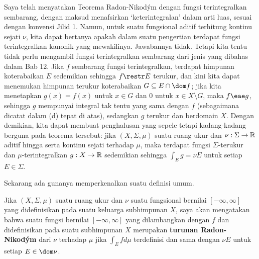 { Saya telah menyatakan Teorema Radon-Nikod\'ym
dengan fungsi terintegralkan sembarang, dengan maksud menafsirkan
`keterintegralan' dalam arti luas, sesuai dengan konvensi Jilid 1. Namun,
untuk suatu fungsional aditif terhitung kontinu sejati $\nu$, kita
dapat bertanya apakah dalam suatu pengertian terdapat fungsi terintegralkan
kanonik yang mewakilinya. Jawabannya tidak. Tetapi kita tentu tidak perlu
mengambil fungsi terintegralkan sembarang dari jenis yang dibahas dalam
Bab 12. Jika $f$ sembarang fungsi terintegralkan, terdapat himpunan
koterabaikan $E$ sedemikian sehingga $f\restr E$ terukur, dan kini kita
dapat menemukan himpunan terukur koterabaikan
$G\subseteq E\cap\dom f$; jika kita menetapkan $g(x)=f(x)$ untuk
$x\in G$ dan $0$ untuk $x\in X\setminus G$, maka $f\eae g$, sehingga
$g$ mempunyai integral tak tentu yang sama dengan $f$ (sebagaimana dicatat
dalam (d) tepat di atas), sedangkan $g$ terukur dan berdomain $X$. Dengan
demikian, kita dapat membuat penghalusan yang sepele tetapi kadang-kadang
berguna pada teorema tersebut: jika $(X,\Sigma,\mu)$ suatu ruang ukur dan
$\nu:\Sigma\to\Bbb R$ aditif hingga serta kontinu sejati terhadap $\mu$,
maka terdapat fungsi $\Sigma$-terukur dan $\mu$-terintegralkan
$g:X\to\Bbb R$ sedemikian sehingga $\int_Eg=\nu E$ untuk setiap
$E\in\Sigma$.

Sekarang ada gunanya memperkenalkan suatu definisi umum.} %
Jika $(X,\Sigma,\mu)$ suatu ruang ukur dan $\nu$ suatu fungsional bernilai
$[-\infty,\infty]$ yang didefinisikan pada suatu keluarga subhimpunan $X$,
saya akan mengatakan bahwa suatu fungsi bernilai $[-\infty,\infty]$ yang
dilambangkan dengan $f$ dan didefinisikan pada suatu subhimpunan $X$ merupakan
{\bf turunan Radon-Nikod\'ym} dari $\nu$ terhadap $\mu$ jika
$\int_Efd\mu$ terdefinisi dan sama dengan
$\nu E$ untuk setiap $E\in\dom\nu$. 



